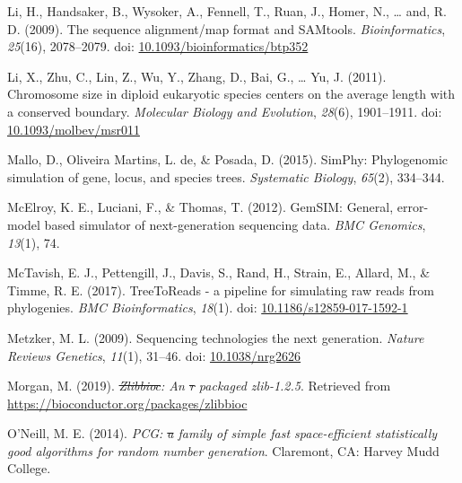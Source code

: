 \documentclass[12pt,]{article}
\providecommand{\DIFaddtex}[1]{{\protect\color{blue}\uwave{#1}}} %
\providecommand{\DIFdeltex}[1]{{\protect\color{red}\sout{#1}}}                      %
\providecommand{\DIFaddbegin}{} %
\providecommand{\DIFaddend}{} %
\providecommand{\DIFdelbegin}{} %
\providecommand{\DIFdelend}{} %
\providecommand{\DIFadd}[1]{\texorpdfstring{\DIFaddtex{#1}}{#1}} %
\providecommand{\DIFdel}[1]{\texorpdfstring{\DIFdeltex{#1}}{}} %
\newcommand{\DIFscaledelfig}{0.5}
\newlength{\DIFdelgraphicswidth} %
\newlength{\DIFdelgraphicsheight} %
\newcommand{\DIFaddincludegraphics}[2][]{{\color{blue}\fbox{\DIFOincludegraphics[#1]{#2}}}} %
\newcommand{\DIFdelincludegraphics}[2][]{%
\sbox{\DIFdelgraphicsbox}{\DIFOincludegraphics[#1]{#2}}%
\settoboxwidth{\DIFdelgraphicswidth}{\DIFdelgraphicsbox} %
\settoboxtotalheight{\DIFdelgraphicsheight}{\DIFdelgraphicsbox} %
\scalebox{\DIFscaledelfig}{%
\parbox[b]{\DIFdelgraphicswidth}{\usebox{\DIFdelgraphicsbox}\\[-\baselineskip] \rule{\DIFdelgraphicswidth}{0em}}\llap{\resizebox{\DIFdelgraphicswidth}{\DIFdelgraphicsheight}{%
\setlength{\unitlength}{\DIFdelgraphicswidth}%
\begin{picture}(1,1)%
\thicklines\linethickness{2pt} %
{\color[rgb]{1,0,0}\put(0,0){\framebox(1,1){}}}%
{\color[rgb]{1,0,0}\put(0,0){\line( 1,1){1}}}%
{\color[rgb]{1,0,0}\put(0,1){\line(1,-1){1}}}%
\end{picture}%
}\hspace*{3pt}}} %
} %
\DeclareRobustCommand{\DIFaddbegin}{\DIFOaddbegin \let\includegraphics\DIFaddincludegraphics} %
\DeclareRobustCommand{\DIFaddend}{\DIFOaddend \let\includegraphics\DIFOincludegraphics} %
\DeclareRobustCommand{\DIFdelbegin}{\DIFOdelbegin \let\includegraphics\DIFdelincludegraphics} %
\DeclareRobustCommand{\DIFdelend}{\DIFOaddend \let\includegraphics\DIFOincludegraphics} %
\begin{document}
\leavevmode\hypertarget{ref-Li_2009}{}%
Li, H., Handsaker, B., Wysoker, A., Fennell, T., Ruan, J., Homer, N., \ldots{} and, R. D. (2009). The sequence alignment/map format and SAMtools. \emph{Bioinformatics}, \emph{25}(16), 2078--2079. doi: \href{https://doi.org/10.1093/bioinformatics/btp352}{10.1093/bioinformatics/btp352}

\leavevmode\hypertarget{ref-Li_2011}{}%
Li, X., Zhu, C., Lin, Z., Wu, Y., Zhang, D., Bai, G., \ldots{} Yu, J. (2011). Chromosome size in diploid eukaryotic species centers on the average length with a conserved boundary. \emph{Molecular Biology and Evolution}, \emph{28}(6), 1901--1911. doi: \href{https://doi.org/10.1093/molbev/msr011}{10.1093/molbev/msr011}

\leavevmode\hypertarget{ref-Mallo_2015}{}%
Mallo, D., Oliveira Martins, L. de, \& Posada, D. (2015). SimPhy: Phylogenomic simulation of gene, locus, and species trees. \emph{Systematic Biology}, \emph{65}(2), 334--344.

\leavevmode\hypertarget{ref-McElroy_2012}{}%
McElroy, K. E., Luciani, F., \& Thomas, T. (2012). GemSIM: General, error-model based simulator of next-generation sequencing data. \emph{BMC Genomics}, \emph{13}(1), 74.

\leavevmode\hypertarget{ref-McTavish_2017}{}%
McTavish, E. J., Pettengill, J., Davis, S., Rand, H., Strain, E., Allard, M., \& Timme, R. E. (2017). TreeToReads - a pipeline for simulating raw reads from phylogenies. \emph{BMC Bioinformatics}, \emph{18}(1). doi: \href{https://doi.org/10.1186/s12859-017-1592-1}{10.1186/s12859-017-1592-1}

\leavevmode\hypertarget{ref-Metzker_2009}{}%
Metzker, M. L. (2009). Sequencing technologies \DIFaddbegin \DIFadd{--- }\DIFaddend the next generation. \emph{Nature Reviews Genetics}, \emph{11}(1), 31--46. doi: \href{https://doi.org/10.1038/nrg2626}{10.1038/nrg2626}

\leavevmode\hypertarget{ref-Morgan_2019}{}%
Morgan, M. (2019). \emph{\DIFdelbegin \DIFdel{Zlibbioc}\DIFdelend \DIFaddbegin \DIFadd{zlibbioc}\DIFaddend : An \DIFdelbegin \DIFdel{r }\DIFdelend \DIFaddbegin \DIFadd{R }\DIFaddend packaged zlib-1.2.5}. Retrieved from \DIFdelbegin %
\DIFdelend \DIFaddbegin \url{https://bioconductor.org/packages/zlibbioc}
\DIFaddend 

\leavevmode\hypertarget{ref-Oneill_2014pcg}{}%
O'Neill, M. E. (2014). \emph{PCG: \DIFdelbegin \DIFdel{a }\DIFdelend \DIFaddbegin \DIFadd{A }\DIFaddend family of simple fast space-efficient statistically good algorithms for random number generation}. Claremont, CA: Harvey Mudd College.
\end{document}
